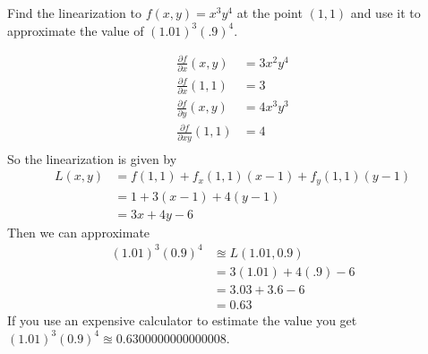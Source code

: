 \documentclass[12pt]{exam}
\begin{document}
\begin{questions}
\question Find the linearization to \(f(x,y)=x^3y^4\) at the point \((1,1)\) and use it to approximate the value of \((1.01)^3(.9)^4\).
\ifprintanswers
        \begin{solution}
            \begin{align*}
                \frac{\partial f}{\partial x}(x,y) & = 3x^2y^4\\
                \frac{\partial f}{\partial x}(1,1) & = 3\\
                \frac{\partial f}{\partial y}(x,y) & = 4x^3y^3\\
                \frac{\partial f}{\partial xy}(1,1) & = 4\\
            \end{align*}
            So the linearization is given by 
            \begin{align*}
                L(x,y) & = f(1,1)+f_{x}(1,1)(x-1)+f_{y}(1,1)(y-1)\\ 
                    & = 1+3(x-1)+4(y-1)\\
                    & = 3x+4y-6
            \end{align*}
            Then we can approximate
            \begin{align*}
                (1.01)^3(0.9)^4 & \approxeq L(1.01,0.9)\\
                    & = 3(1.01)+4(.9)-6\\
                    & = 3.03+3.6-6 \\
                    & = 0.63
            \end{align*}
            If you use an expensive calculator to estimate the value you get 
            \( (1.01)^3(0.9)^4\approxeq 0.6300000000000008\).
        \end{solution}
    \else
        \vfill
    \fi


\end{questions}
\end{document}
